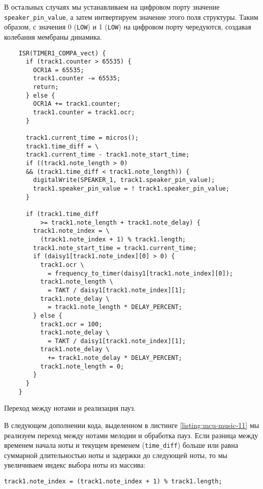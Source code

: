\documentclass[../sparc.tex]{subfiles}
\begin{document}
В остальных случаях мы устанавливаем на цифровом порту значение \\
\texttt{speaker_pin_value}, а затем интвертируем значение этого поля
структуры.  Таким образом, с значения 0 (\texttt{LOW}) и 1
(\texttt{LOW}) на цифровом порту чередуются, создавая колебания
мембраны динамика.

\begin{listing}[H]
  \begin{verbatim}
    ISR(TIMER1_COMPA_vect) {
      if (track1.counter > 65535) {
        OCR1A = 65535;
        track1.counter -= 65535;
        return;
      } else {
        OCR1A += track1.counter;
        track1.counter = track1.ocr;
      }

      track1.current_time = micros();
      track1.time_diff = \
      track1.current_time - track1.note_start_time;
      if ((track1.note_length > 0)
      && (track1.time_diff < track1.note_length)) {
        digitalWrite(SPEAKER_1, track1.speaker_pin_value);
        track1.speaker_pin_value = ! track1.speaker_pin_value;
      }

      if (track1.time_diff
          >= track1.note_length + track1.note_delay) {
        track1.note_index = \
          (track1.note_index + 1) % track1.length;
        track1.note_start_time = track1.current_time;
        if (daisy1[track1.note_index][0] > 0) {
          track1.ocr \
            = frequency_to_timer(daisy1[track1.note_index][0]);
          track1.note_length \
            = TAKT / daisy1[track1.note_index][1];
          track1.note_delay \
            = track1.note_length * DELAY_PERCENT;
        } else {
          track1.ocr = 100;
          track1.note_delay \
            = TAKT / daisy1[track1.note_index][1];
          track1.note_delay \
            += track1.note_delay * DELAY_PERCENT;
          track1.note_length = 0;
        }
      }
    }
  \end{verbatim}
  \caption{Переход между нотами и реализация пауз.}
  \label{listing:mcu-music-11}
\end{listing}

В следующем дополнении кода, выделенном в листинге \ref{listing:mcu-music-11} мы
реализуем переход между нотами мелодии и обработка пауз.  Если разница между
временем начала ноты и текущем временем (\texttt{time_diff}) больше или
равна суммарной длительностью ноты и задержки до следующей ноты, то мы
увеличиваем индекс выбора ноты из массива:

\begin{verbatim}
track1.note_index = (track1.note_index + 1) % track1.length;
\end{verbatim}
\end{document}
